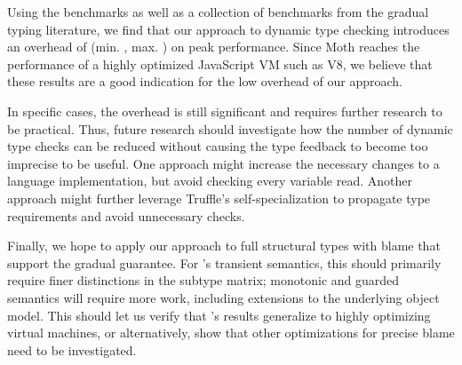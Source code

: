 Using the \AWFY benchmarks as well as a collection of benchmarks from the
gradual typing literature, we find that our approach to dynamic type checking
introduces an overhead of 
\OverheadTypingGMeanP (min. \OverheadTypingMinP, max. \OverheadTypingMaxP)
on peak performance.
Since Moth reaches the performance of a
highly optimized JavaScript VM such as V8,
we believe that these results are a good indication
for the low overhead of our approach.


In specific cases, the overhead is still significant and requires further
research to be practical. Thus, future research should investigate how the
number of dynamic type checks can be reduced without causing
the type feedback to become too imprecise to be useful.
One approach might increase the necessary changes to a language implementation,
but avoid checking every variable read.
Another approach might further leverage Truffle's self-specialization
to propagate type requirements and avoid unnecessary checks.

Finally, we hope to apply our approach to full structural types with
blame that support the gradual guarantee.  For
\citet{reticPython2014}'s transient semantics, this should primarily
require finer distinctions in the subtype matrix; monotonic and
guarded semantics will require more work, including extensions to the
underlying object model.  This should let us verify that
\citet{Richards2017}'s results generalize to highly optimizing virtual
machines, or alternatively, show that other optimizations for precise
blame need to be investigated.

